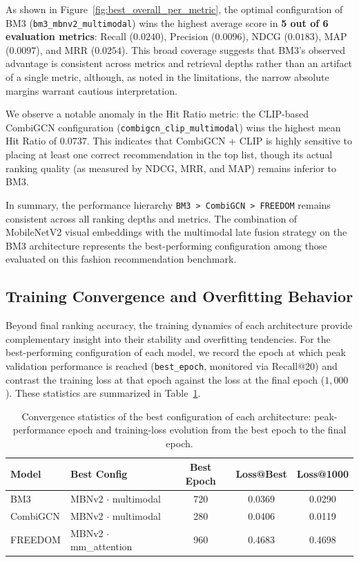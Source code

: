 As shown in Figure~\ref{fig:best_overall_per_metric}, the optimal configuration of BM3 (\texttt{bm3\_mbnv2\_multimodal}) wins the highest average score in \textbf{5 out of 6 evaluation metrics}: Recall ($0.0240$), Precision ($0.0096$), NDCG ($0.0183$), MAP ($0.0097$), and MRR ($0.0254$). This broad coverage suggests that BM3's observed advantage is consistent across metrics and retrieval depths rather than an artifact of a single metric, although, as noted in the limitations, the narrow absolute margins warrant cautious interpretation.

We observe a notable anomaly in the Hit Ratio metric: the CLIP-based CombiGCN configuration (\texttt{combigcn\_clip\_multimodal}) wins the highest mean Hit Ratio of $0.0737$. This indicates that CombiGCN + CLIP is highly sensitive to placing at least one correct recommendation in the top list, though its actual ranking quality (as measured by NDCG, MRR, and MAP) remains inferior to BM3.

In summary, the performance hierarchy \texttt{BM3 > CombiGCN > FREEDOM} remains consistent across all ranking depths and metrics. The combination of MobileNetV2 visual embeddings with the multimodal late fusion strategy on the BM3 architecture represents the best-performing configuration among those evaluated on this fashion recommendation benchmark.

\subsection{Training Convergence and Overfitting Behavior}

Beyond final ranking accuracy, the training dynamics of each architecture provide complementary insight into their stability and overfitting tendencies. For the best-performing configuration of each model, we record the epoch at which peak validation performance is reached (\texttt{best\_epoch}, monitored via Recall@20) and contrast the training loss at that epoch against the loss at the final epoch ($1{,}000$). These statistics are summarized in Table~\ref{tab:convergence_analysis}.

\begin{table}[H]
\centering
\caption{Convergence statistics of the best configuration of each architecture: peak-performance epoch and training-loss evolution from the best epoch to the final epoch.}
\label{tab:convergence_analysis}
\small
\setlength{\tabcolsep}{6pt}
\begin{tabular}{llccc}
\hline
\textbf{Model} & \textbf{Best Config} & \textbf{Best Epoch} & \textbf{Loss@Best} & \textbf{Loss@1000} \\ \hline
BM3 & MBNv2 $\cdot$ multimodal & 720 & 0.0369 & 0.0290 \\
CombiGCN & MBNv2 $\cdot$ multimodal & 280 & 0.0406 & 0.0119 \\
FREEDOM & MBNv2 $\cdot$ mm\_attention & 960 & 0.4683 & 0.4698 \\ \hline
\end{tabular}
\end{table}

